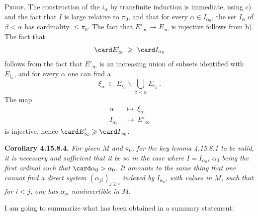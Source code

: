 \textsc{Proof}. The construction of the $i_\alpha$ by transfinite induction is immediate, using c) and the fact that $I$ is large relative to $\pi_0$, and that for every $\alpha \in I_{\alpha_0}$, the set $I_\alpha$
of $\beta < \alpha$ has cardinality $\leqslant \pi_0$. The fact that $E'_\infty \longrightarrow E_\infty$ is injective follows from b). The fact that
\[
\card E'_\infty \ \geqslant \ \card I_{\alpha_0}
\]
follows from the fact that $E'_\infty$ is an increasing union of subsets identified with $E_{i_\alpha}$, and for every
$\alpha$ one can find a
\[
\xi_\alpha \ \in \ E_{i_\alpha}\backslash \bigcup_{\beta<\alpha} E_{i_\beta} \ .
\]
The map
\[
\begin{aligned}
\alpha \ &\longmapsto \ \xi_\alpha\\
I_{\alpha_0} \ &\longrightarrow \ E'_\infty
\end{aligned}
\]
is injective, hence $\card E'_\infty \geqslant \card I_{\alpha_0}$.

\textbf{Corollary 4.15.8.4.} \textit{For given $M$ and $\pi_0$, for the key lemma 4.15.8.1 to be valid, it is necessary and sufficient that it be so in the case where $I = I_{\alpha_0}$, $\alpha_0$ being the first ordinal such that} $\card \alpha_0 > \alpha_0$. \textit{It amounts to the same thing that one cannot find a direct system $(\alpha_{ji})_{j\geqslant i}$ indexed by $I_{\alpha_0}$, with values in $M$, such that for $i < j$, one has $\alpha_{ji}$ noninvertible in $M$.} %

I am going to summarize what has been obtained in a summary statement:

